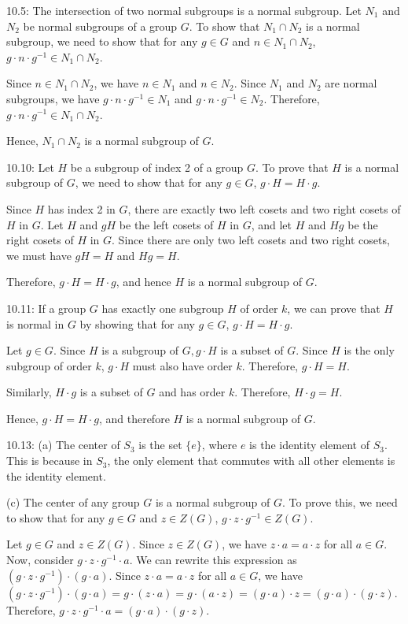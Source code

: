 10.5: The intersection of two normal subgroups is a normal subgroup. Let $N_1$ and $N_2$ be normal subgroups of a group $G$. To show that $N_1 \cap N_2$ is a normal subgroup, we need to show that for any $g \in G$ and $n \in N_1 \cap N_2$, $g \cdot n \cdot g^{-1} \in N_1 \cap N_2$.

Since $n \in N_1 \cap N_2$, we have $n \in N_1$ and $n \in N_2$. Since $N_1$ and $N_2$ are normal subgroups, we have $g \cdot n \cdot g^{-1} \in N_1$ and $g \cdot n \cdot g^{-1} \in N_2$. Therefore, $g \cdot n \cdot g^{-1} \in N_1 \cap N_2$.

Hence, $N_1 \cap N_2$ is a normal subgroup of $G$.

10.10: Let $H$ be a subgroup of index 2 of a group $G$. To prove that $H$ is a normal subgroup of $G$, we need to show that for any $g \in G$, $g \cdot H = H \cdot g$.

Since $H$ has index 2 in $G$, there are exactly two left cosets and two right cosets of $H$ in $G$. Let $H$ and $gH$ be the left cosets of $H$ in $G$, and let $H$ and $Hg$ be the right cosets of $H$ in $G$. Since there are only two left cosets and two right cosets, we must have $gH = H$ and $Hg = H$.

Therefore, $g \cdot H = H \cdot g$, and hence $H$ is a normal subgroup of $G$.

10.11: If a group $G$ has exactly one subgroup $H$ of order $k$, we can prove that $H$ is normal in $G$ by showing that for any $g \in G$, $g \cdot H = H \cdot g$.

Let $g \in G$. Since $H$ is a subgroup of $G, g \cdot H$ is a subset of $G$. Since $H$ is the only subgroup of order $k$, $g \cdot H$ must also have order $k$. Therefore, $g \cdot H = H$.

Similarly, $H \cdot g$ is a subset of $G$ and has order $k$. Therefore, $H \cdot g = H$.

Hence, $g \cdot H = H \cdot g$, and therefore $H$ is a normal subgroup of $G$.

10.13:
(a) The center of $S_3$ is the set $\{e\}$, where $e$ is the identity element of $S_3$. This is because in $S_3$, the only element that commutes with all other elements is the identity element.

(c) The center of any group $G$ is a normal subgroup of $G$. To prove this, we need to show that for any $g \in G$ and $z \in Z(G)$, $g \cdot z \cdot g^{-1} \in Z(G)$.

Let $g \in G$ and $z \in Z(G)$. Since $z \in Z(G)$, we have $z \cdot a = a \cdot z$ for all $a \in G$. Now, consider $g \cdot z \cdot g^{-1} \cdot a$. We can rewrite this expression as $(g \cdot z \cdot g^{-1}) \cdot (g \cdot a)$. Since $z \cdot a = a \cdot z$ for all $a \in G$, we have $(g \cdot z \cdot g^{-1}) \cdot (g \cdot a) = g \cdot (z \cdot a) = g \cdot (a \cdot z) = (g \cdot a) \cdot z = (g \cdot a) \cdot (g \cdot z)$. Therefore, $g \cdot z \cdot g^{-1} \cdot a = (g \cdot a) \cdot (g \cdot z)$.

